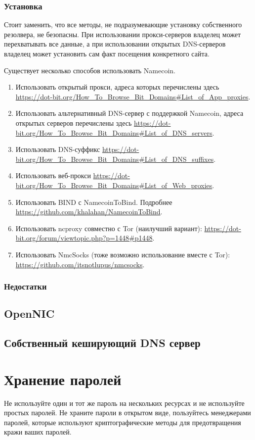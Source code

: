 \subsubsection{Установка}
\begin{important}
Стоит заменить, что все методы, не подразумевающие установку собственного резолвера, не безопасны. При использовании прокси-серверов владелец может перехватывать все данные, а при использовании открытых DNS-серверов владелец может установить сам факт посещения конкретного сайта.
\end{important}
Существует несколько способов использовать Namecoin.
\begin{enumerate}
\item Использовать открытый прокси, адреса которых перечислены здесь \url{https://dot-bit.org/How_To_Browse_Bit_Domains#List_of_App_proxies}.
\item Использовать альтернативный DNS-сервер с поддержкой Namecoin, адреса открытых серверов перечислены здесь \url{https://dot-bit.org/How_To_Browse_Bit_Domains#List_of_DNS_servers}.
\item Использовать DNS-суффикс \url{https://dot-bit.org/How_To_Browse_Bit_Domains#List_of_DNS_suffixes}.
\item Использовать веб-прокси \url{https://dot-bit.org/How_To_Browse_Bit_Domains#List_of_Web_proxies}.
\item Использовать BIND с NamecoinToBind. Подробнее \url{https://github.com/khalahan/NamecoinToBind}.
\item Использовать ncproxy совместно с Tor (наилучший вариант): \url{https://dot-bit.org/forum/viewtopic.php?p=1448#p1448}.
\item Использовать NmcSocks (тоже возможно использование вместе с Tor): \url{https://github.com/itsnotlupus/nmcsocks}.
\end{enumerate}
\subsubsection{Недостатки}
\subsection{OpenNIC}
\subsection{Собственный кеширующий DNS сервер}

\section{Хранение паролей}
\begin{important}
Не используйте один и тот же пароль на нескольких ресурсах и не используйте простых паролей. Не храните пароли в открытом виде, пользуйтесь менеджерами паролей, которые используют криптографические методы для предотвращения кражи ваших паролей.
\end{important}
